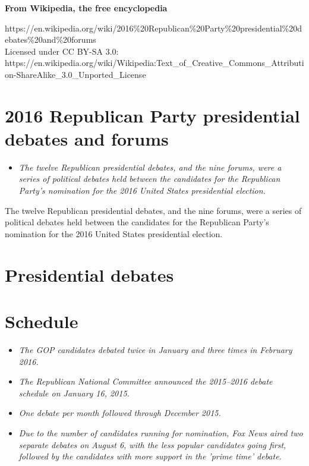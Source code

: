 \textbf{From Wikipedia, the free encyclopedia}

https://en.wikipedia.org/wiki/2016\%20Republican\%20Party\%20presidential\%20debates\%20and\%20forums\\
Licensed under CC BY-SA 3.0:\\
https://en.wikipedia.org/wiki/Wikipedia:Text\_of\_Creative\_Commons\_Attribution-ShareAlike\_3.0\_Unported\_License

\section{2016 Republican Party presidential debates and
forums}\label{republican-party-presidential-debates-and-forums}

\begin{itemize}
\item
  \emph{The twelve Republican presidential debates, and the nine forums,
  were a series of political debates held between the candidates for the
  Republican Party's nomination for the 2016 United States presidential
  election.}
\end{itemize}

The twelve Republican presidential debates, and the nine forums, were a
series of political debates held between the candidates for the
Republican Party's nomination for the 2016 United States presidential
election.

\section{Presidential debates}\label{presidential-debates}

\section{Schedule}\label{schedule}

\begin{itemize}
\item
  \emph{The GOP candidates debated twice in January and three times in
  February 2016.}
\item
  \emph{The Republican National Committee announced the 2015--2016
  debate schedule on January 16, 2015.}
\item
  \emph{One debate per month followed through December 2015.}
\item
  \emph{Due to the number of candidates running for nomination, Fox News
  aired two separate debates on August 6, with the less popular
  candidates going first, followed by the candidates with more support
  in the 'prime time' debate.}
\end{itemize}

